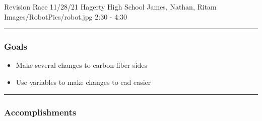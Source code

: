 \insertmeeting 
  {Revision Race} 
  {11/28/21}
  {Hagerty High School}
  {James, Nathan, Ritam}
  {Images/RobotPics/robot.jpg}
  {2:30 - 4:30}
  
\noindent\hfil\rule{\textwidth}{.4pt}\hfil
\subsubsection*{Goals}
\begin{itemize}
    \item Make several changes to carbon fiber sides
    \item Use variables to make changes to cad easier


\end{itemize} 

\noindent\hfil\rule{\textwidth}{.4pt}\hfil

\subsubsection*{Accomplishments}

